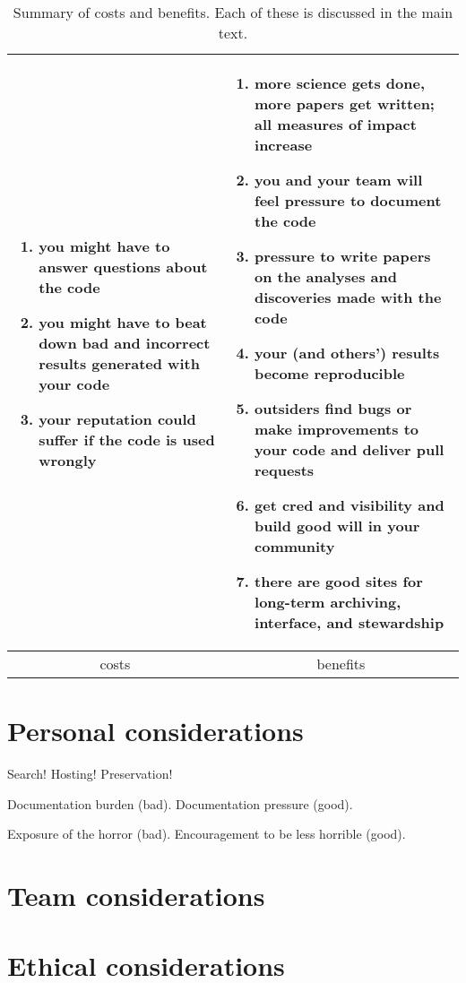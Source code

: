 \documentclass[12pt,twoside,pdftex]{article}
\begin{document}
\begin{table}
\begin{tabular}{@{}p{}|p{}@{}}
\begin{enumerate}
\item you might have to answer questions about the code
\item you might have to beat down bad and incorrect results generated with your code
\item your reputation could suffer if the code is used wrongly
\end{enumerate}&\begin{enumerate}\raggedright
\item more science gets done, more papers get written; all measures of impact increase
\item you and your team will feel pressure to document the code
\item pressure to write papers on the analyses and discoveries made with the code
\item your (and others') results become reproducible
\item outsiders find bugs or make improvements to your code and deliver pull requests
\item get cred and visibility and build good will in your community
\item there are good sites for long-term archiving, interface, and stewardship
\end{enumerate} \\
\hline\multicolumn{1}{c|}{costs} & \multicolumn{1}{c}{benefits} \\
\end{tabular}
\caption{Summary of costs and benefits. Each of these is discussed in
  the main text.\label{tab:summary}}
\end{table}

\section{Personal considerations}

Search! Hosting! Preservation!

Documentation burden (bad). Documentation pressure (good).

Exposure of the horror (bad). Encouragement to be less horrible (good).

\section{Team considerations}

\section{Ethical considerations}
\end{document}
